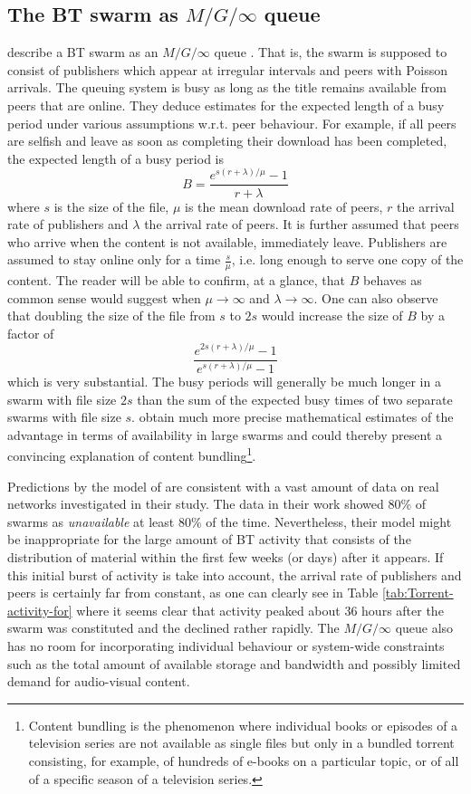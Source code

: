 \documentclass[12pt,english]{apa6}
\begin{document}
\subsection{The BT swarm as $M/G/\infty$ queue}

\citet{menasche_content_2009} describe a BT swarm as an $M/G/\infty$
queue \citep{browne_transient_1993}. That is, the swarm is supposed
to consist of publishers which appear at irregular intervals and peers
with Poisson arrivals. The queuing system is busy as long as the title
remains available from peers that are online. They deduce estimates
for the expected length of a busy period under various assumptions
w.r.t. peer behaviour. For example, if all peers are selfish and leave
as soon as completing their download has been completed, the expected
length of a busy period is
\[
B=\frac{e^{s(r+\lambda)/\mu}-1}{r+\lambda}
\]
where $s$ is the size of the file, $\mu$ is the mean download rate
of peers, $r$ the arrival rate of publishers and $\lambda$ the arrival
rate of peers. It is further assumed that peers who arrive when the
content is not available, immediately leave. Publishers are assumed
to stay online only for a time $\frac{s}{\mu}$, i.e. long enough
to serve one copy of the content. The reader will be able to confirm,
at a glance, that $B$ behaves as common sense would suggest when
$\mu\rightarrow\infty$ and $\lambda\rightarrow\infty$. One can also
observe that doubling the size of the file from $s$ to $2s$ would
increase the size of $B$ by a factor of
\[
\frac{e^{2s(r+\lambda)/\mu}-1}{e^{s(r+\lambda)/\mu}-1}
\]
which is very substantial. The busy periods will generally be much
longer in a swarm with file size $2s$ than the sum of the expected
busy times of two separate swarms with file size $s$. \citet{menasche_content_2009}
obtain much more precise mathematical estimates of the advantage in
terms of availability in large swarms and could thereby present a
convincing explanation of content bundling\footnote{Content bundling is the phenomenon where individual books or episodes
of a television series are not available as single files but only
in a bundled torrent consisting, for example, of hundreds of e-books
on a particular topic, or of all of a specific season of a television
series.}.

Predictions by the model of \citet{menasche_content_2009} are consistent
with a vast amount of data on real networks investigated in their
study. The data in their work showed 80\% of swarms as \emph{unavailable}
at least 80\% of the time. Nevertheless, their model might be inappropriate
for the large amount of BT activity that consists of the distribution
of material within the first few weeks (or days) after it appears.
If this initial burst of activity is take into account, the arrival
rate of publishers and peers is certainly far from constant, as one
can clearly see in Table \ref{tab:Torrent-activity-for} where it
seems clear that activity peaked about 36 hours after the swarm was
constituted and the declined rather rapidly. The $M/G/\infty$ queue
also has no room for incorporating individual behaviour or system-wide
constraints such as the total amount of available storage and bandwidth
and possibly limited demand for audio-visual content.
\end{document}

